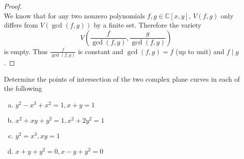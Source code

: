\documentclass{article}
\newenvironment{problem}[2][Problem]{\begin{trivlist}
\item[\hskip \labelsep {\bfseries #1}\hskip \labelsep {\bfseries #2.}]}{\end{trivlist}}
\newcommand{\paren}[1]{\left( #1 \right)}
\begin{document}
\begin{proof} ~ \\
  We know that for any two nonzero polynomials $f, g \in \mathbb C[x,y]$,
  $V(f, g)$ only differs from $V(\gcd(f, g))$ by a finite set. Therefore the
  variety \[
    V\!\paren{\frac f{\gcd(f, g)}, \frac g{\gcd(f, g)}}
  \]
  is empty. Thus $\frac f{\gcd(f, g)}$ is constant and $\gcd(f, g) = f$ (up to
  unit) and $f \mid g$.
\end{proof}
\pagebreak
\begin{problem}{8 (Artin)}
  Determine the points of intersection of the two complex plane curves in each
  of the following \begin{enumerate}[(a)]
    \item $y^2 - x^3 + x^2 = 1, x + y = 1$
    \item $x^2 + xy + y^2 = 1, x^2 + 2y^2 = 1$
    \item $y^2 = x^3, xy = 1$
    \item $x + y + y^2 = 0, x - y + y^2 = 0$
  \end{enumerate}
\end{problem}
\end{document}
